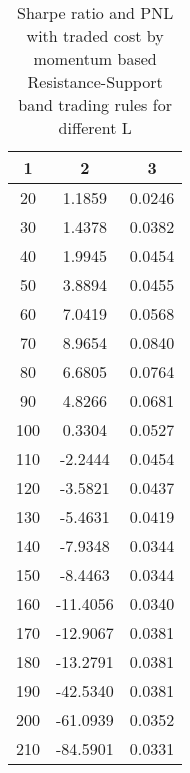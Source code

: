 \documentclass[11pt]{article}
\begin{document}
\begin{table}[ht]
\centering
\begin{tabular}{ccc}
  \hline
1 & 2 & 3 \\ 
  \hline
   20 & 1.1859 & 0.0246 \\ 
     30 & 1.4378 & 0.0382 \\ 
     40 & 1.9945 & 0.0454 \\ 
     50 & 3.8894 & 0.0455 \\ 
     60 & 7.0419 & 0.0568 \\ 
     70 & 8.9654 & 0.0840 \\ 
     80 & 6.6805 & 0.0764 \\ 
     90 & 4.8266 & 0.0681 \\ 
    100 & 0.3304 & 0.0527 \\ 
    110 & -2.2444 & 0.0454 \\ 
    120 & -3.5821 & 0.0437 \\ 
    130 & -5.4631 & 0.0419 \\ 
    140 & -7.9348 & 0.0344 \\ 
    150 & -8.4463 & 0.0344 \\ 
    160 & -11.4056 & 0.0340 \\ 
    170 & -12.9067 & 0.0381 \\ 
    180 & -13.2791 & 0.0381 \\ 
    190 & -42.5340 & 0.0381 \\ 
    200 & -61.0939 & 0.0352 \\ 
    210 & -84.5901 & 0.0331 \\ 
   \hline
\end{tabular}
\caption{Sharpe ratio and PNL with traded cost by momentum based Resistance-Support band trading rules for different L}\label{RS_tc_mom}
\end{table}
\end{document}
